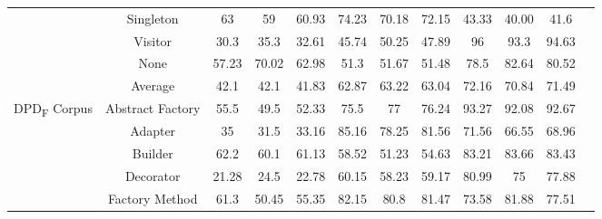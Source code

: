 \documentclass[conference]{IEEEtran}
\begin{document}
\begin{table}
\begin{tabular}{|c|c|c|c|c|c|c|c|c|c|c|c|}
                                                     & Singleton        & 63                                & 59                               & 60.93                                      & 74.23  & 70.18  & 72.15     & 43.33  & 40.00  & 41.6      \\
                                                     & Visitor          & 30.3                              & 35.3                             & 32.61                                      & 45.74  & 50.25  & 47.89     & 96     & 93.3   & 94.63     \\
                                                     & None             & 57.23                             & 70.02                            & 62.98                                      & 51.3   & 51.67  & 51.48     & 78.5   & 82.64  & 80.52     \\
        \cline{2-11}
                                                     & Average          & 42.1                              & 42.1                             & 41.83                                      & 62.87  & 63.22  & 63.04     & 72.16  & 70.84  & 71.49     \\
        \hline
        \multirow{9}{*}{DPD\textsubscript{F} Corpus} & Abstract Factory & 55.5                              & 49.5                             & 52.33                                      & 75.5   & 77     & 76.24     & 93.27  & 92.08  & 92.67     \\
                                                     & Adapter          & 35                                & 31.5                             & 33.16                                      & 85.16  & 78.25  & 81.56     & 71.56  & 66.55  & 68.96     \\
                                                     & Builder          & 62.2                              & 60.1                             & 61.13                                      & 58.52  & 51.23  & 54.63     & 83.21  & 83.66  & 83.43     \\
                                                     & Decorator        & 21.28                             & 24.5                             & 22.78                                      & 60.15  & 58.23  & 59.17     & 80.99  & 75     & 77.88     \\
                                                     & Factory Method   & 61.3                              & 50.45                            & 55.35                                      & 82.15  & 80.8   & 81.47     & 73.58  & 81.88  & 77.51     \\

\end{tabular}
\end{table}
\end{document}
